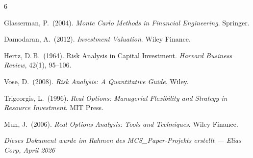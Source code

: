 \documentclass[12pt,a4paper]{article}
\begin{document}
\begin{thebibliography}{6}

Glasserman, P.\ (2004).
\textit{Monte Carlo Methods in Financial Engineering}.
Springer.

Damodaran, A.\ (2012).
\textit{Investment Valuation}.
Wiley Finance.

Hertz, D.\,B.\ (1964).
Risk Analysis in Capital Investment.
\textit{Harvard Business Review}, 42(1), 95--106.

Vose, D.\ (2008).
\textit{Risk Analysis: A Quantitative Guide}.
Wiley.

Trigeorgis, L.\ (1996).
\textit{Real Options: Managerial Flexibility and Strategy in Resource Investment}.
MIT Press.

Mun, J.\ (2006).
\textit{Real Options Analysis: Tools and Techniques}.
Wiley Finance.

\end{thebibliography}

\vspace{1cm}
\noindent\textit{Dieses Dokument wurde im Rahmen des MCS\_Paper-Projekts erstellt — Elias Corp, April 2026}
\end{document}
